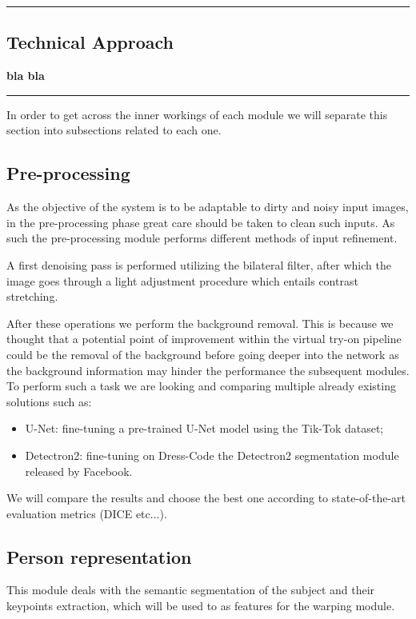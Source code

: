 {\color{gray}\hrule}
\begin{center}
\section{Technical Approach}
\textbf{bla bla }
\end{center}
{\color{gray}\hrule}


\begin{multicols}{2}
In order to get across the inner workings of each module we will separate this section into subsections related to each one.

\subsection{Pre-processing}
As the objective of the system is to be adaptable to dirty and noisy input images, in the pre-processing phase great care should be taken to clean such inputs. As such the pre-processing module performs different methods of input refinement.

A first denoising pass is performed utilizing the bilateral filter, after which the image goes through a light adjustment procedure which entails contrast stretching.

After these operations we perform the background removal. This is because we thought that a potential point of improvement within the virtual try-on pipeline could be the removal of the background before going deeper into the network as the background information may hinder the performance the subsequent modules. To perform such a task we are looking and comparing multiple already existing solutions such as:
\begin{itemize}
\item U-Net: fine-tuning a pre-trained U-Net model using the Tik-Tok dataset;
\item Detectron2: fine-tuning on Dress-Code the Detectron2 segmentation module released by Facebook.
\end{itemize}

We will compare the results and choose the best one according to state-of-the-art evaluation metrics (DICE etc...).



\subsection{Person representation}
This module deals with the semantic segmentation of the subject and their keypoints extraction, which will be used to as features for the warping module.


\end{multicols}

